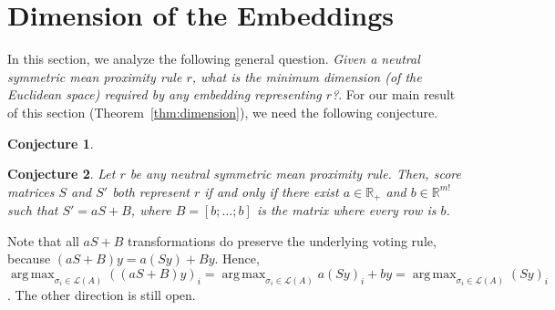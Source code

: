 \documentclass[10pt,letterpaper]{article}
\newcommand{\calL}{{\mathcal{L}}}
\newcommand{\rank}{{\calL(A)}}
\DeclareMathOperator*{\argmax}{arg\,max}
\newtheorem{conjecture}{Conjecture}
\begin{document}

\section{Dimension of the Embeddings}

In this section, we analyze the following general question. \emph{Given a neutral symmetric mean proximity rule $r$, what is the minimum dimension (of the Euclidean space) required by any embedding representing $r$?}. For our main result of this section (Theorem~\ref{thm:dimension}), we need the following conjecture.

\begin{conjecture}

\end{conjecture}

\begin{conjecture}
Let $r$ be any neutral symmetric mean proximity rule. Then, score matrices $S$ and $S'$ both represent $r$ if and only if there exist $a \in \mathbb{R}_{+}$ and $b \in \mathbb{R}^{m!}$ such that $S' = aS+B$, where $B = [b;\ldots;b]$ is the matrix where every row is $b$. 
\label{conj:equivalent-score-matrix}
\end{conjecture}
Note that all $aS+B$ transformations do preserve the underlying voting rule, because $(aS+B)y = a(Sy)+By$. Hence, $\argmax_{\sigma_i \in \rank} ((aS+B)y)_i = \argmax_{\sigma_i \in \rank} a(Sy)_i + by = \argmax_{\sigma_i \in \rank} (Sy)_i$. The other direction is still open.
\end{document}
